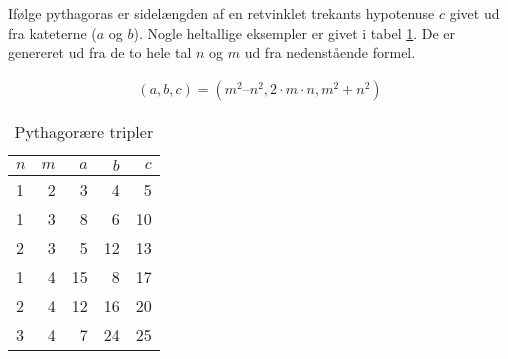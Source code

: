 \documentclass{article}
\begin{document}
Ifølge pythagoras er sidelængden af en retvinklet trekants hypotenuse $c$ givet ud fra 
kateterne ($a$ og $b$). Nogle heltallige eksempler er givet i tabel \ref{tabPythagoras}.
De er genereret ud fra de to hele tal $n$ og $m$ ud fra nedenstående formel.

\begin{align}
(a, b, c) = (m^2 – n^2, 2 \cdot m \cdot n, m^2 + n^2) 
\end{align}


\begin{table}
\centering
\begin{tabular}{lr|rrr}
$n$ & $m$ & $a$ & $b$ & $c$ \\
\hline
1 & 2 	& 3 		& 4 		& 5	\\
1 & 3 	& 8 		& 6 		& 10	\\
2 & 3 	& 5 		& 12 	& 13	\\
1 & 4 	& 15 	& 8 		& 17	\\
2 & 4 	& 12 	& 16 	& 20	\\
3 & 4 	& 7 		& 24 	& 25	\\
\end{tabular}
\caption{Pythagorære tripler}
\label{tabPythagoras}
\end{table}
\end{document}
